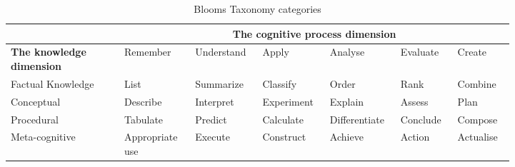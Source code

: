 \begin{table}[h]
    \centering
    \begin{tabular}{|p{0.2\linewidth}|p{0.12\linewidth}|p{0.1\linewidth}|p{0.1\linewidth}|p{0.1\linewidth}|p{0.1\linewidth}|p{0.1\linewidth}|}
    \hline
      & \multicolumn{6}{c|}{\textbf{The cognitive process dimension}}  \\ \hline
	\textbf{The knowledge dimension} & Remember & Understand  & Apply & Analyse & Evaluate & Create \\ \hline
	Factual Knowledge & List & Summarize & Classify & Order & Rank & Combine \\ \hline
	Conceptual & Describe & Interpret & Experiment & Explain & Assess & Plan \\ \hline
	Procedural & Tabulate & Predict & Calculate & Differentiate & Conclude & Compose \\ \hline
	Meta-cognitive & Appropriate use & Execute & Construct & Achieve & Action & Actualise \\ \hline
    \end{tabular}
    \caption{Blooms Taxonomy categories}
    \label{tab:bloomsubcategories}
\end{table}
